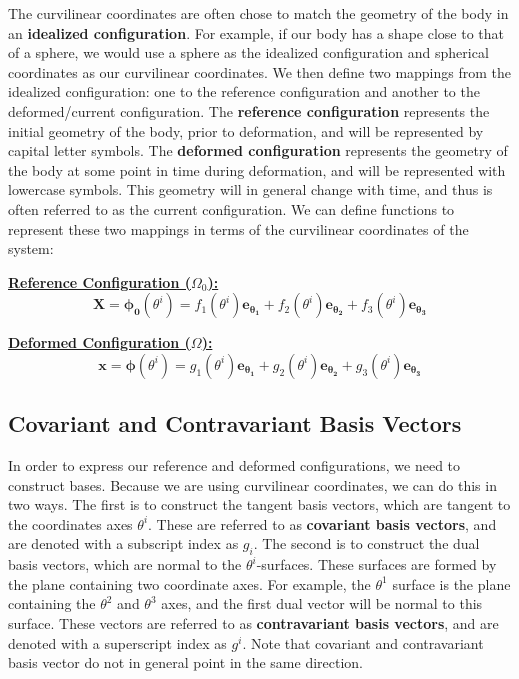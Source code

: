 \documentclass[]{spie}  %
\begin{document}
The curvilinear coordinates are often chose to match the geometry of the body in an \textbf{idealized configuration}. For example, if our body has a shape close to that of a sphere, we would use a sphere as the idealized configuration and spherical coordinates as our curvilinear coordinates. We then define two mappings from the idealized configuration: one to the reference configuration and another to the deformed/current configuration. The \textbf{reference configuration} represents the initial geometry of the body, prior to deformation, and will be represented by capital letter symbols. The \textbf{deformed configuration} represents the geometry of the body at some point in time during deformation, and will be represented with lowercase symbols. This geometry will in general change with time, and thus is often referred to as the current configuration. We can define functions to represent these two mappings in terms of the curvilinear coordinates of the system:

\underline{\textbf{Reference Configuration ($\Omega_0$):}}
\begin{equation}
\bm{X} = \bm{\phi_0}(\theta^i) = f_1(\theta^i)\bm{{e_{\theta_1}}} + f_2(\theta^i)\bm{{e_{\theta_2}}} + f_3(\theta^i)\bm{{e_{\theta_3}}}
\end{equation}

\underline{\textbf{Deformed Configuration ($\Omega$):}}
\begin{equation}
\bm{x} = \bm{\phi}(\theta^i) = g_1(\theta^i)\bm{{e_{\theta_1}}} + g_2(\theta^i)\bm{{e_{\theta_2}}} + g_3(\theta^i)\bm{{e_{\theta_3}}}
\end{equation}

\subsection{Covariant and Contravariant Basis Vectors}
In order to express our reference and deformed configurations, we need to construct bases. Because we are using curvilinear coordinates, we can do this in two ways. The first is to construct the tangent basis vectors, which are tangent to the coordinates axes $\theta^i$. These are referred to as \textbf{covariant basis vectors}, and are denoted with a subscript index as $g_i$. The second is to construct the dual basis vectors, which are normal to the $\theta^i$-surfaces. These surfaces are formed by the plane containing two coordinate axes. For example, the $\theta^1$ surface is the plane containing the $\theta^2$ and $\theta^3$ axes, and the first dual vector will be normal to this surface. These vectors are referred to as \textbf{contravariant basis vectors}, and are denoted with a superscript index as $g^i$. Note that covariant and contravariant basis vector do not in general point in the same direction. 
\end{document}
